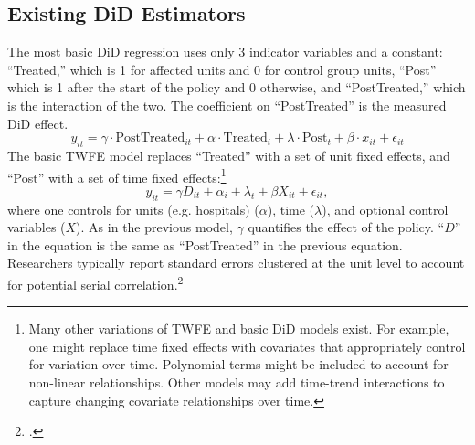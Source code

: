 \documentclass[12pt]{article}
\begin{document}
\subsection{Existing DiD Estimators}
The most basic DiD regression uses only 3 indicator variables and a constant: “Treated,” which is 1 for affected units and 0 for control group units, “Post” which is 1 after the start of the policy and 0 otherwise, and “PostTreated,” which is the interaction of the two. The coefficient on “PostTreated” is the measured DiD effect.
\begin{equation}
    y_{it} = \gamma \cdot \text{PostTreated}_{it} + \alpha\cdot \text{Treated}_i + \lambda \cdot \text{Post}_t + \beta \cdot x_{it} + \epsilon_{it}
\end{equation}
The basic TWFE model replaces “Treated” with a set of unit fixed effects, and “Post” with a set of time fixed effects:\footnote{Many other variations of TWFE and basic DiD models exist. For example, one might replace time fixed effects with covariates that appropriately control for variation over time. Polynomial terms might be included to account for non-linear relationships. Other models may add time-trend interactions to capture changing covariate relationships over time.}
\begin{equation}
    y_{it} = \gamma D_{it} + \alpha_i + \lambda_t + \beta X_{it} + \epsilon_{it},    
\end{equation}
where one controls for units (e.g. hospitals) ($\alpha$), time ($\lambda$), and optional control variables ($X$). As in the previous model, $\gamma$ quantifies the effect of the policy. “$D$” in the equation is the same as “PostTreated” in the previous equation. Researchers typically report standard errors clustered at the unit level to account for potential serial correlation.\footnote{\citet{bertrand2004}.} 
\end{document}
